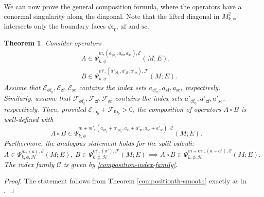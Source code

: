 \documentclass[11pt]{article}
\numberwithin{equation}{section}
\theoremstyle{plain}
\newtheorem{Th}{Theorem}[section]
\theoremstyle{definition}
\newcommand{\Cmath}{{\mathscr{C}}}
\newcommand\calE{{\mathcal E}}
\newcommand\calF{{\mathcal F}}
\newcommand{\calH}{{\mathscr{H}}}
\newcommand{\phif}{{\phi\mathrm{f}}}
\newcommand{\lf}{{\mathrm{lb}}}
\newcommand{\rf}{{\mathrm{rb}}}
\newcommand{\ssc}{{\mathrm{sc}}}
\newcommand{\zf}{{\mathrm{zf}}}
\begin{document}
We can now prove the general composition formula, where the operators have a conormal
singularity along the diagonal. Note that the lifted diagonal in $M^2_{k,\phi}$ intersects only the
boundary faces $\phif_0$, $\zf$ and $\ssc$.

\begin{Th} \label{compositionth}
Consider operators\vspace*{-3pt}
\begin{align*}
&A \in \Psi_{k, \phi}^{m,(a_{\phif_0},a_{\zf}, a_{\ssc}), \mathcal{E}}(M; E), \\
&B \in \Psi_{k, \phi}^{m',(a'_{\phif_0},a'_{\zf}, a'_{\ssc}), \mathcal{F}}(M; E).
\end{align*}
Assume that $\mathcal{E}_{\phif_0},\mathcal{E}_{\zf}, \mathcal{E}_{\ssc}$ contains the
index sets $a_{\phif_0},a_{\zf}, a_{\ssc}$, respectively. Similarly, assume that
$\mathcal{F}_{\phif_0}, \mathcal{F}_{\zf}, \mathcal{F}_{\ssc}$ contains the
index sets $a'_{\phif_0},a'_{\zf}, a'_{\ssc}$, respectively.
Then, provided $\mathcal{E}_{\rf_0} + \mathcal{F}_{\lf_0} > 0$, the composition of operators $A \circ B$
is well-defined with\vspace*{-3pt}
\[
A \circ B \in \Psi_{k, \phi}^{m+m',(a_{\phif_0} + a'_{\phif_0}, a_{\zf} + a'_{\zf}, a_{\ssc}
+ a'_{\ssc}), \,\mathscr{C}}(M; E).
\]
Furthermore, the analogous statement holds for the split calculi:\vspace*{-3pt}
\[
A \in\Psi^{m,(a),\calE}_{k,\phi,\calH}(M; E),\ B\in \Psi^{m',(a'),\calF}_{k,\phi,\calH}(M; E)
\implies
A\circ B \in \Psi^{m+m',(a+a'),\Cmath}_{k,\phi,\calH}(M; E).
\]
The index family $\mathscr{C}$ is given by \eqref{composition-index-family}.
\end{Th}

\begin{proof}
The statement follows from Theorem \ref{compositionth-smooth}
exactly as in \cite[\S 6]{guillarmou2008resolvent}.
\end{proof}

\end{document}

